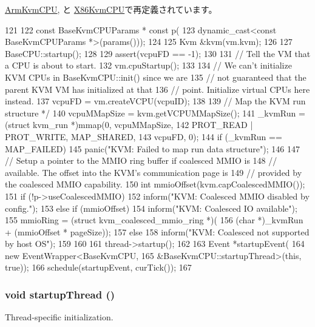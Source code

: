 \hyperlink{classArmKvmCPU_aecc7d8debf54990ffeaaed5bac7d7d81}{ArmKvmCPU}, と \hyperlink{classX86KvmCPU_aecc7d8debf54990ffeaaed5bac7d7d81}{X86KvmCPU}で再定義されています。


\begin{DoxyCode}
121 {
122     const BaseKvmCPUParams * const p(
123         dynamic_cast<const BaseKvmCPUParams *>(params()));
124 
125     Kvm &kvm(vm.kvm);
126 
127     BaseCPU::startup();
128 
129     assert(vcpuFD == -1);
130 
131     // Tell the VM that a CPU is about to start.
132     vm.cpuStartup();
133 
134     // We can't initialize KVM CPUs in BaseKvmCPU::init() since we are
135     // not guaranteed that the parent KVM VM has initialized at that
136     // point. Initialize virtual CPUs here instead.
137     vcpuFD = vm.createVCPU(vcpuID);
138 
139     // Map the KVM run structure */
140     vcpuMMapSize = kvm.getVCPUMMapSize();
141     _kvmRun = (struct kvm_run *)mmap(0, vcpuMMapSize,
142                                      PROT_READ | PROT_WRITE, MAP_SHARED,
143                                      vcpuFD, 0);
144     if (_kvmRun == MAP_FAILED)
145         panic("KVM: Failed to map run data structure\n");
146 
147     // Setup a pointer to the MMIO ring buffer if coalesced MMIO is
148     // available. The offset into the KVM's communication page is
149     // provided by the coalesced MMIO capability.
150     int mmioOffset(kvm.capCoalescedMMIO());
151     if (!p->useCoalescedMMIO) {
152         inform("KVM: Coalesced MMIO disabled by config.\n");
153     } else if (mmioOffset) {
154         inform("KVM: Coalesced IO available\n");
155         mmioRing = (struct kvm_coalesced_mmio_ring *)(
156             (char *)_kvmRun + (mmioOffset * pageSize));
157     } else {
158         inform("KVM: Coalesced not supported by host OS\n");
159     }
160 
161     thread->startup();
162 
163     Event *startupEvent(
164         new EventWrapper<BaseKvmCPU,
165                          &BaseKvmCPU::startupThread>(this, true));
166     schedule(startupEvent, curTick());
167 }
\end{DoxyCode}
\hypertarget{classBaseKvmCPU_abc1464ae4d17eb8f6ea86c6bb5f68532}{
\subsubsection[{startupThread}]{\setlength{\rightskip}{0pt plus 5cm}void startupThread ()}}
\label{classBaseKvmCPU_abc1464ae4d17eb8f6ea86c6bb5f68532}
Thread-\/specific initialization.

